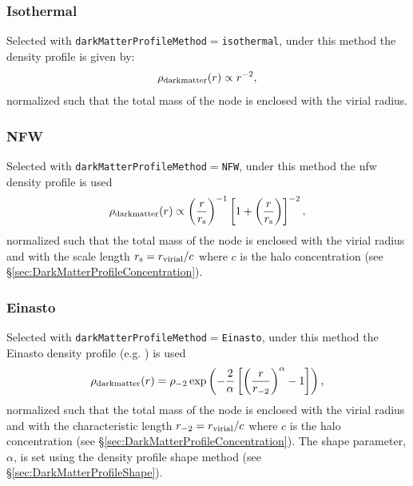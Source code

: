 \subsubsection{Isothermal}

Selected with {\tt darkMatterProfileMethod}$=${\tt isothermal}, under this method the density profile is given by:
\begin{equation}
 \rho_{\rm dark matter}(r) \propto r^{-2},
\end{equation}
normalized such that the total mass of the \gls{node} is enclosed with the virial radius.

\subsubsection{NFW}

Selected with {\tt darkMatterProfileMethod}$=${\tt NFW}, under this method the \gls{nfw} density profile \citep{navarro_universal_1997} is used
\begin{equation}
  \rho_{\rm dark matter}(r) \propto \left({r\over r_{\rm s}}\right)^{-1} \left[1 + \left({r\over r_{\rm s}}\right) \right]^{-2},
\end{equation}
normalized such that the total mass of the \gls{node} is enclosed with the virial radius and with the scale length $r_{\rm s} = r_{\rm virial}/c$ where $c$ is the halo concentration (see \S\ref{sec:DarkMatterProfileConcentration}).

\subsubsection{Einasto}

Selected with {\tt darkMatterProfileMethod}$=${\tt Einasto}, under this method the Einasto density profile (e.g. \citealt{cardone_spherical_2005}) is used
\begin{equation}
  \rho_{\rm dark matter}(r) = \rho_{-2} \exp \left( - {2 \over \alpha} \left[ \left( {r \over r_{-2}} \right)^\alpha - 1 \right] \right),
\end{equation}
normalized such that the total mass of the \gls{node} is enclosed with the virial radius and with the characteristic length $r_{-2} = r_{\rm virial}/c$ where $c$ is the halo concentration (see \S\ref{sec:DarkMatterProfileConcentration}). The shape parameter, $\alpha$, is set using the density profile shape method (see \S\ref{sec:DarkMatterProfileShape}).

